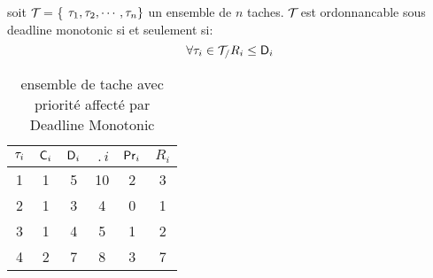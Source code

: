 \begin{theoreme}
soit $\mathcal{T}_{}$ = \{ $\tau_{1},\tau_{2},\cdots, \tau_{n} \}$ un ensemble de $n$
taches.  $\mathcal{T}_{}$ est ordonnancable sous deadline monotonic si et seulement si:
\begin{equation}
\forall \tau_{i} \in \mathcal{T}_{/} R_{i} \leq \mathsf{D}_{i}
\end{equation}

\end{theoreme}

\begin{table}[h]
\begin{center}
\begin{tabular}{|c|c|c|c|c|c|}
 \hline$\tau_{i}$ & $\mathsf{C}_{i}$ & $\mathsf{D}_{i}$ & $\period{i}$ & $\mathsf{Pr}_{i}$ & $R_i$\\ 
 \hline1 & 1 & 5 & 10 & 2 & 3\\ 
 \hline2 & 1 & 3 & 4 & 0 & 1\\ 
 \hline3 & 1 & 4 & 5 & 1 & 2\\ 
 \hline4 & 2 & 7 & 8 & 3 & 7\\ 
 \hline
 \end{tabular}
\end{center}
\caption{ensemble de tache avec priorité affecté par Deadline
  Monotonic} \label{tab:exempleDM}
\end{table}







